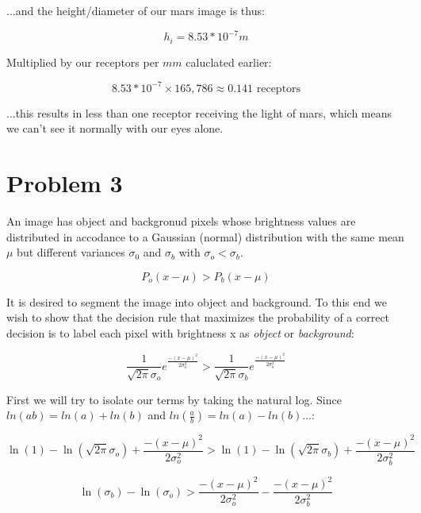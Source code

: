 \documentclass{article}
\begin{document}
...and the height/diameter of our mars image is thus:

\begin{equation}
    h_i = 8.53*10^{-7}m
\end{equation}

Multiplied by our receptors per $mm$ caluclated earlier:

\begin{equation}
    8.53*10^{-7} \times 165,786 \approx 0.141 \text{ receptors}
\end{equation}

...this results in less than one receptor receiving the light of mars, which means we can't see it normally with our eyes alone.

\section*{Problem 3}

An image has object and backgronud pixels whose brightness values are distributed in accodance to a Gaussian (normal) distribution with the same mean $\mu$ but different variances $\sigma_0$ and $\sigma_b$ with $\sigma_o < \sigma_b$.

\begin{equation}
    P_o(x-\mu) > P_b(x-\mu)
\end{equation}

It is desired to segment the image into object and background. To this end we wish to show that the decision rule that maximizes the probability of a correct decision is to label each pixel with brightness x as \textit{object} or \textit{background}:

\begin {equation}
    \frac{1}{\sqrt{2\pi}\sigma_o}e^{\frac{-(x-\mu)^2}{2\sigma^2_o}} > \frac{1}{\sqrt{2\pi}\sigma_b}e^{\frac{-(x-\mu)^2}{2\sigma^2_b}}
\end{equation}

First we will try to isolate our terms by taking the natural log. Since $ln(ab) = ln(a) + ln(b)$ and $ln(\frac{a}{b}) = ln(a) - ln(b)$...:

\begin{equation}
    \ln(1) - \ln(\sqrt{2\pi}\sigma_o) + \frac{-(x-\mu)^2}{2\sigma^2_o} > \ln(1) - \ln(\sqrt{2\pi}\sigma_b) + \frac{-(x-\mu)^2}{2\sigma^2_b}
\end{equation}

\begin{equation}
    \ln(\sigma_b) - \ln(\sigma_o) > \frac{-(x-\mu)^2}{2\sigma^2_o} - \frac{-(x-\mu)^2}{2\sigma^2_b}
\end{equation}
\end{document}
